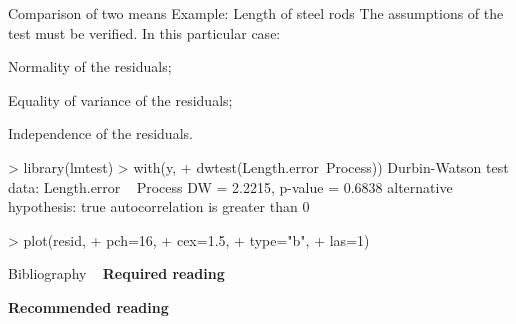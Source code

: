 \documentclass[t]{beamer}
\begin{document}

\begin{ftstf}
{Comparison of two means}
{Example: Length of steel rods}
The assumptions of the test must be verified. In this particular case:

\bitems Normality of the residuals;
\item Equality of variance of the residuals;
\item \alert{Independence of the residuals}.
\eitem
\begin{rcode}
> library(lmtest)
> with(y,
+      dwtest(Length.error~Process))
Durbin-Watson test
data:  Length.error ~ Process
DW = 2.2215, p-value = 0.6838
alternative hypothesis: true autocorrelation 
is greater than 0

> plot(resid,
+      pch=16,
+      cex=1.5,
+      type="b",
+      las=1)
\end{rcode}
\end{ftstf}













\begin{ftst}
{Bibliography}
{\ }
\scriptsize
\textbf{Required reading}

\benums %
\eenum

\textbf{Recommended reading}

\benums %
\eenum
\end{ftst}
\end{document}
